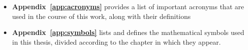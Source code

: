 \begin{itemize}
\item\textbf{Appendix~\ref{app:acronyms}} provides a list of important acronyms that are used in the course of this work, along with their definitions

\item\textbf{Appendix~\ref{app:symbols}} lists and defines the mathematical symbols used in this thesis, divided according to the chapter in which they appear.


\end{itemize}







